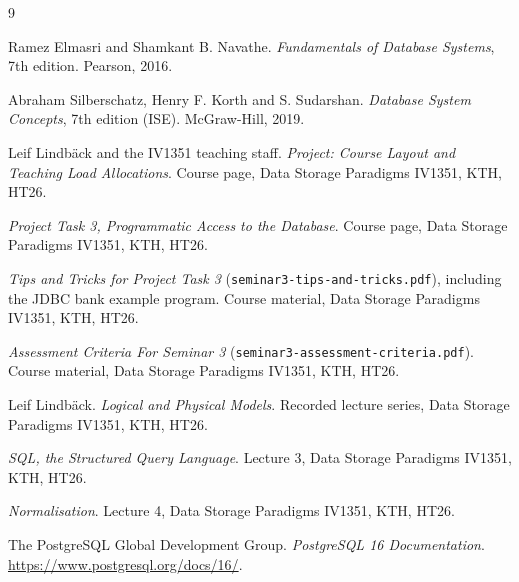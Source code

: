 \documentclass[a4paper]{scrartcl}
\renewcommand{\_}{\textunderscore\allowbreak}
\begin{document}
\renewcommand{\refname}{}
\vspace{-2\baselineskip}
\begin{thebibliography}{9}

Ramez Elmasri and Shamkant B. Navathe.
\textit{Fundamentals of Database Systems}, 7th edition.
Pearson, 2016.

Abraham Silberschatz, Henry F. Korth and S. Sudarshan.
\textit{Database System Concepts}, 7th edition (ISE).
McGraw-Hill, 2019.

Leif Lindbäck and the IV1351 teaching staff.
\textit{Project: Course Layout and Teaching Load Allocations}.
Course page, Data Storage Paradigms IV1351, KTH, HT26.

\textit{Project Task 3, Programmatic Access to the Database}.
Course page, Data Storage Paradigms IV1351, KTH, HT26.

\textit{Tips and Tricks for Project Task 3} (\texttt{seminar3-tips-and-tricks.pdf}),
including the JDBC bank example program.
Course material, Data Storage Paradigms IV1351, KTH, HT26.

\textit{Assessment Criteria For Seminar 3} (\texttt{seminar3-assessment-criteria.pdf}).
Course material, Data Storage Paradigms IV1351, KTH, HT26.

Leif Lindbäck.
\textit{Logical and Physical Models}. Recorded lecture series,
Data Storage Paradigms IV1351, KTH, HT26.

\textit{SQL, the Structured Query Language}. Lecture 3, Data Storage Paradigms IV1351, KTH, HT26.

\textit{Normalisation}. Lecture 4, Data Storage Paradigms IV1351, KTH, HT26.

The PostgreSQL Global Development Group.
\textit{PostgreSQL 16 Documentation}.
\url{https://www.postgresql.org/docs/16/}.

\end{thebibliography}
\end{document}
